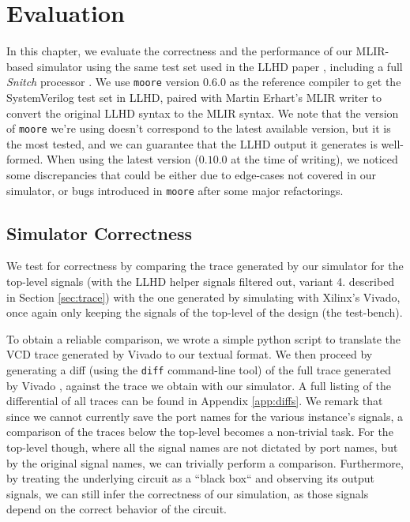 \chapter{Evaluation}
\label{ch:eval}

In this chapter, we evaluate the correctness and the performance of our MLIR-based simulator using the same test set used in the LLHD paper \cite{Schuiki2020}, including a full \textit{Snitch} processor \cite{Zaruba2020}. We use \texttt{moore} version $0.6.0$ as the reference compiler to get the SystemVerilog test set in LLHD, paired with Martin Erhart's MLIR writer to convert the original LLHD syntax to the MLIR syntax. We note that the version of \texttt{moore} we're using doesn't correspond to the latest available version, but it is the most tested, and we can guarantee that the LLHD output it generates is well-formed. When using the latest version ($0.10.0$ at the time of writing), we noticed some discrepancies that could be either due to edge-cases not covered in our simulator, or bugs introduced in \texttt{moore} after some major refactorings.


\section{Simulator Correctness}
\label{sec:correctness}
We test for correctness by comparing the trace generated by our simulator for the top-level signals (with the LLHD helper signals filtered out, variant 4. described in Section \ref{sec:trace}) with the one generated by simulating with Xilinx's Vivado, once again only keeping the signals of the top-level of the design (\ie the test-bench).

To obtain a reliable comparison, we wrote a simple python script to translate the VCD trace generated by Vivado to our textual format. We then proceed by generating a diff (using the \texttt{diff} command-line tool) of the full trace generated by Vivado \cite{vivado}, against the trace we obtain with our simulator.
A full listing of the differential of all traces can be found in Appendix \ref{app:diffs}. We remark that since we cannot currently save the port names for the various instance's signals, a comparison of the traces below the top-level becomes a non-trivial task. For the top-level though, where all the signal names are not dictated by port names, but by the original signal names, we can trivially perform a comparison. Furthermore, by treating the underlying circuit as a “black box“ and observing its output signals, we can still infer the correctness of our simulation, as those signals depend on the correct behavior of the circuit.

